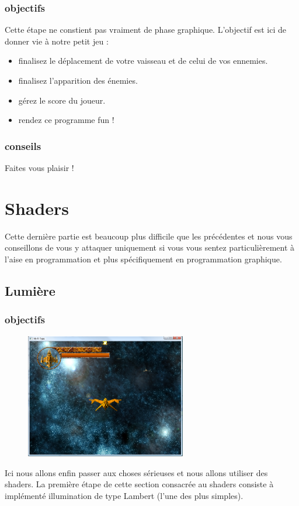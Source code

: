 \documentclass[12pt,a4paper]{report}
\begin{document}
\subsection{objectifs}
Cette étape ne constient pas vraiment de phase graphique. L'objectif est ici de donner vie
à notre petit jeu :\\
\begin{itemize}
\item finalisez le déplacement de votre vaisseau et de celui de vos ennemies.
\item finalisez l'apparition des énemies.
\item gérez le score du joueur.
\item rendez ce programme fun !
\end{itemize}

\subsection{conseils}
Faites vous plaisir !
\newpage

\chapter{Shaders}
Cette dernière partie est beaucoup plus difficile que les précédentes et nous
vous conseillons de vous y attaquer uniquement si vous vous sentez particulièrement à l'aise
en programmation et plus spécifiquement en programmation graphique.
\section{Lumière}
\subsection{objectifs}
\begin{figure}[!h]\centering\includegraphics[width=7cm]{light_window.png}\end{figure}
Ici nous allons enfin passer aux choses sérieuses et nous allons utiliser des shaders. La première
étape de cette section consacrée au shaders consiste à implémenté illumination
de type Lambert (l'une des plus simples).
\newpage
\end{document}
